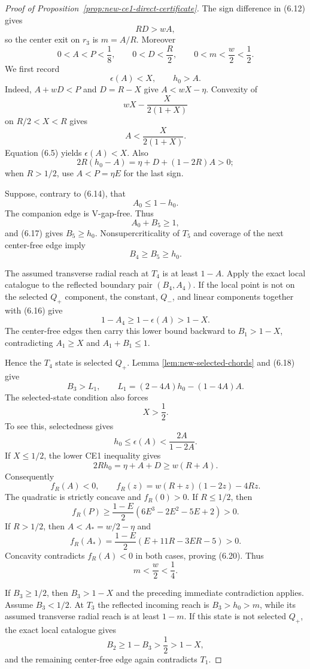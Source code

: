 \begin{proof}[Proof of Proposition~\ref{prop:new-ce1-direct-certificate}]
The sign difference in (6.12) gives
\[
 RD>wA,
\]
so the center exit on $r_3$ is $m=A/R$.  Moreover
\[
 0<A<P<\frac18,
 \qquad 0<D<\frac R2,
 \qquad 0<m<\frac w2<\frac12.
 \tag{6.15}
\]
We first record
\[
 \epsilon(A)<X,
 \qquad h_0>A.
 \tag{6.16}
\]
Indeed, $A+wD<P$ and $D=R-X$ give $A<wX-\eta$.  Convexity of
\[
 wX-\frac{X}{2(1+X)}
\]
on $R/2<X<R$ gives
\[
 A<\frac{X}{2(1+X)}.
\]
Equation (6.5) yields $\epsilon(A)<X$.  Also
\[
 2R(h_0-A)=\eta+D+(1-2R)A>0;
\]
when $R>1/2$, use $A<P=\eta E$ for the last sign.

Suppose, contrary to (6.14), that
\[
 A_0\le1-h_0.
 \tag{6.17}
\]
The companion edge is V-gap-free.  Thus
\[
 A_0+B_5\ge1,
\]
and (6.17) gives $B_5\ge h_0$.  Nonsupercriticality of $T_5$ and coverage
of the next center-free edge imply
\[
 \boxed{B_4\ge B_5\ge h_0.}
 \tag{6.18}
\]

The assumed transverse radial reach at $T_4$ is at least $1-A$.  Apply the exact local
catalogue to the reflected boundary pair $(B_4,A_4)$.  If the local point is
not on the selected $Q_+$ component, the constant, $Q_-$, and linear
components together with (6.16) give
\[
 1-A_4\ge1-\epsilon(A)>1-X.
\]
The center-free edges then carry this lower bound backward to
$B_1>1-X$, contradicting $A_1\ge X$ and
$A_1+B_1\le1$.

Hence the $T_4$ state is selected $Q_+$.  Lemma
\ref{lem:new-selected-chords} and (6.18) give
\[
 B_3>L_1,
 \qquad
 L_1=(2-4A)h_0-(1-4A)A.
 \tag{6.19}
\]
The selected-state condition also forces
\[
 \boxed{X>\frac12.}
 \tag{6.20}
\]
To see this, selectedness gives
\[
 h_0\le\epsilon(A)<\frac{2A}{1-2A}.
\]
If $X\le1/2$, the lower CE1 inequality gives
\[
 2Rh_0=\eta+A+D\ge w(R+A).
\]
Consequently
\[
 f_R(A)<0,
 \qquad
 f_R(z)=w(R+z)(1-2z)-4Rz.
\]
The quadratic is strictly concave and $f_R(0)>0$.  If $R\le1/2$, then
\[
 f_R(P)\ge\frac{1-E}{2}
 (6E^3-2E^2-5E+2)>0.
\]
If $R>1/2$, then $A<A_*=w/2-\eta$ and
\[
 f_R(A_*)=\frac{1-E}{2}(E+11R-3ER-5)>0.
\]
Concavity contradicts $f_R(A)<0$ in both cases, proving (6.20).  Thus
\[
 m<\frac w2<\frac14.
 \tag{6.21}
\]

If $B_3\ge1/2$, then $B_3>1-X$ and the preceding immediate contradiction
applies.  Assume $B_3<1/2$.  At $T_3$ the reflected incoming reach is
$B_3>h_0>m$, while its assumed transverse radial reach is at least $1-m$.  If this state is
not selected $Q_+$, the exact local catalogue gives
\[
 B_2\ge1-B_3>\frac12>1-X,
\]
and the remaining center-free edge again contradicts $T_1$.


\end{proof}
